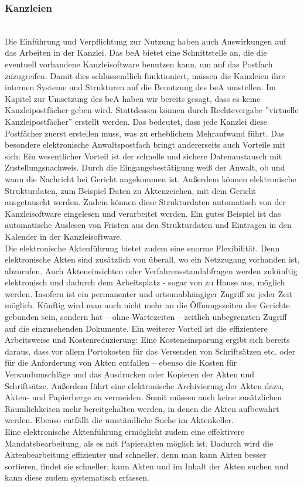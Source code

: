 \subsubsection{Kanzleien}\hspace*{\fill} \\
Die Einführung und Verpflichtung zur Nutzung haben auch Auswirkungen auf das Arbeiten in der Kanzlei. Das beA bietet eine Schnittstelle an, die die eventuell vorhandene Kanzleisoftware benutzen kann, um auf das Postfach zuzugreifen. Damit dies schlussendlich funktioniert, müssen die Kanzleien ihre internen Systeme und Strukturen auf die Benutzung des beA umstellen. Im Kapitel zur Umsetzung des beA haben wir bereits gesagt, dass es keine Kanzleipostfächer geben wird. Stattdessen können durch Rechtevergabe ''virtuelle Kanzleipostfächer'' erstellt werden. Das bedeutet, dass jede Kanzlei diese Postfächer zuerst erstellen muss, was zu erheblichem Mehraufwand führt.  
Das besondere elektronische Anwaltspostfach bringt andererseits auch Vorteile mit sich: Ein wesentlicher Vorteil ist der schnelle und sichere Datenaustausch mit Zustellungsnachweis. Durch die Eingangsbestätigung weiß der Anwalt, ob und wann die Nachricht bei Gericht angekommen ist. Außerdem können elektronische Strukturdaten, zum Beispiel Daten zu Aktenzeichen, mit dem Gericht ausgetauscht werden. Zudem können diese Strukturdaten automatisch von der Kanzleisoftware eingelesen und verarbeitet werden. Ein gutes Beispiel ist das automatische Auslesen von Fristen aus den Strukturdaten und Eintragen in den Kalender in der Kanzleisoftware. \\
Die elektronische Aktenführung bietet zudem eine enorme Flexibilität. Denn elektronische Akten sind zusätzlich von überall, wo ein Netzzugang vorhanden ist, abzurufen. Auch Akteneinsichten oder Verfahrensstandabfragen werden zukünftig elektronisch und dadurch dem Arbeitsplatz - sogar von zu Hause aus, möglich werden. Insofern ist ein permanenter und ortsunabhängiger Zugriff zu jeder Zeit möglich. Künftig wird man auch nicht mehr an die Öffnungszeiten der Gerichte gebunden sein, sondern hat – ohne Wartezeiten –  zeitlich unbegrenzten Zugriff auf die einzusehenden Dokumente.
Ein weiterer Vorteil ist die effizientere Arbeitsweise und Kostenreduzierung: Eine Kosteneinsparung ergibt sich bereits daraus, dass vor allem Portokosten für das Versenden von Schriftsätzen etc. oder für die Anforderung von Akten entfallen – ebenso die Kosten für Versandumschläge und das Ausdrucken oder Kopieren der Akten und Schriftsätze. Außerdem führt eine elektronische Archivierung der Akten dazu, Akten- und Papierberge zu vermeiden. Somit müssen auch keine zusätzlichen Räumlichkeiten mehr bereitgehalten werden, in denen die Akten aufbewahrt werden. Ebenso entfällt die umständliche Suche im Aktenkeller. \\
Eine elektronische Aktenführung ermöglicht zudem eine effektivere Mandatsbearbeitung, als es mit Papierakten möglich ist. Dadurch wird die Aktenbearbeitung effizienter und schneller, denn man kann Akten besser sortieren, findet sie schneller, kann Akten und im Inhalt der Akten suchen und kann diese zudem systematisch erfassen.


